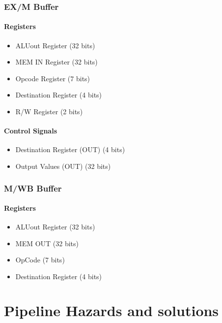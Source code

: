 \documentclass[12pt]{report}
\begin{document}
\section{EX/M Buffer}

\subsection{Registers}
\begin{itemize}
    \item ALUout Register (32 bits)
    \item MEM IN Register (32 bits)
    \item Opcode Register (7 bits)
    \item Destination Register (4 bits)
    \item R/W Register (2 bits)
\end{itemize}

\subsection{Control Signals}
\begin{itemize}
    \item Destination Register (OUT) (4 bits)
    \item Output Values (OUT) (32 bits)
\end{itemize}

\section{M/WB Buffer}

\subsection{Registers}
\begin{itemize}
    \item ALUout Register (32 bits)
    \item MEM OUT (32 bits)
    \item OpCode (7 bits)
    \item Destination Register (4 bits)
\end{itemize}

\part{Pipeline Hazards and solutions}
\end{document}
